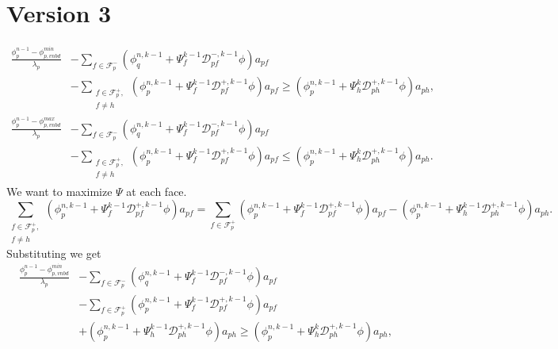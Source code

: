 \documentclass[../thesis.tex]{subfiles}
\begin{document}
\section{Version 3}
\begin{equation*}
	\begin{split}
		\frac{\phi_p^{n-1} - \phi_{p,vnbd}^{min}}{\lambda_p}
		&- \sum_{f \in \mathcal{F}_p^-}
		\left( \phi_q^{n,k-1} + \Psi_{f}^{k-1} \mathcal{D}^{-,k-1}_{pf}\phi	\right) a_{pf}\\
		&- \sum_{
			\substack{
				f \in \mathcal{F}_p^+, \\
				f \neq h}
				} \left( \phi_p^{n,k-1} + \Psi_{f}^{k-1} \mathcal{D}^{+,k-1}_{pf}\phi \right) a_{pf}
		\geq
		\left( \phi_p^{n,k-1} + \Psi_{h}^{k} \mathcal{D}^{+,k-1}_{ph}\phi \right) a_{ph},\\
		\frac{\phi_p^{n-1} - \phi_{p,vnbd}^{max}}{\lambda_p}
		&- \sum_{f \in \mathcal{F}_p^-}
		\left( \phi_q^{n,k-1} + \Psi_{f}^{k-1} \mathcal{D}^{-,k-1}_{pf}\phi	\right) a_{pf}\\
		&- \sum_{
			\substack{
				f \in \mathcal{F}_p^+, \\
				f \neq h}
				} \left( \phi_p^{n,k-1} + \Psi_{f}^{k-1} \mathcal{D}^{+,k-1}_{pf}\phi \right) a_{pf}
		\leq
		\left( \phi_p^{n,k-1} + \Psi_{h}^{k} \mathcal{D}^{+,k-1}_{ph}\phi \right) a_{ph}.
	\end{split}
\end{equation*}
We want to maximize \( \Psi \) at each face.
\[
	\sum_{\substack{
		f \in \mathcal{F}_p^+, \\
		f \neq h}
		} \left( \phi_p^{n,k-1} + \Psi_{f}^{k-1} \mathcal{D}^{+,k-1}_{pf}\phi \right) a_{pf}
	=
	\sum_{f \in \mathcal{F}_p^+}
	\left( \phi_p^{n,k-1} + \Psi_{f}^{k-1} \mathcal{D}^{+,k-1}_{pf}\phi \right) a_{pf} - \left( \phi_p^{n,k-1} + \Psi_{h}^{k-1} \mathcal{D}^{+,k-1}_{ph}\phi \right) a_{ph}.
\]
Substituting we get
\begin{equation*}
	\begin{split}
		\frac{\phi_p^{n-1} - \phi_{p,vnbd}^{min}}{\lambda_p}
		&- \sum_{f \in \mathcal{F}_p^-}
		\left( \phi_q^{n,k-1} + \Psi_{f}^{k-1} \mathcal{D}^{-,k-1}_{pf}\phi	\right) a_{pf}\\
		&- \sum_{f \in \mathcal{F}_p^+}
		\left( \phi_p^{n,k-1} + \Psi_{f}^{k-1} \mathcal{D}^{+,k-1}_{pf}\phi \right) a_{pf}\\
		&+ \left( \phi_p^{n,k-1} + \Psi_{h}^{k-1} \mathcal{D}^{+,k-1}_{ph}\phi \right) a_{ph}
		\geq
		\left( \phi_p^{n,k-1} + \Psi_{h}^{k} \mathcal{D}^{+,k-1}_{ph}\phi \right) a_{ph},
	\end{split}
\end{equation*}
\end{document}
